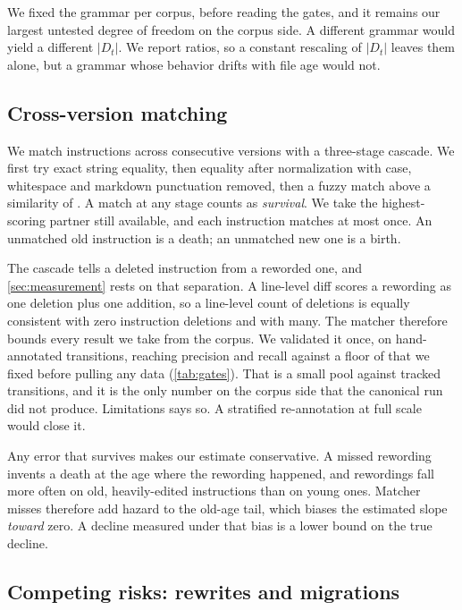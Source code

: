 We fixed the grammar per corpus, before reading the gates, and it remains our largest untested
degree of freedom on the corpus side. A different grammar would yield a different $|D_t|$. We
report ratios, so a constant rescaling of $|D_t|$ leaves them alone, but a grammar whose behavior
drifts with file age would not.

\subsection{Cross-version matching}
\label{sec:appendix:tracking}

We match instructions across consecutive versions with a three-stage cascade. We first try exact
string equality, then equality after normalization with case, whitespace and markdown punctuation
removed, then a fuzzy match above a similarity of \MatchFuzzyThreshold{}. A match at any stage
counts as \emph{survival}. We take the highest-scoring partner still available, and each
instruction matches at most once. An unmatched old instruction is a death; an unmatched new one is
a birth.

The cascade tells a deleted instruction from a reworded one, and \autoref{sec:measurement} rests on
that separation. A line-level diff scores a rewording as one deletion plus one addition, so a
line-level count of deletions is equally consistent with zero instruction deletions and with many.
The matcher therefore bounds every result we take from the corpus. We validated it once, on
\GateBPool{} hand-annotated transitions, reaching \GateBPrecision{} precision and \GateBRecall{}
recall against a floor of \GateBFloor{} that we fixed before pulling any data
(\autoref{tab:gates}). That is a small pool against \FieldMatches{} tracked transitions, and it is
the only number on the corpus side that the canonical run did not produce. Limitations says so. A
stratified re-annotation at full scale would close it.

Any error that survives makes our estimate conservative. A missed rewording invents a death at the
age where the rewording happened, and rewordings fall more often on old, heavily-edited
instructions than on young ones. Matcher misses therefore add hazard to the old-age tail, which
biases the estimated slope \emph{toward} zero. A decline measured under that bias is a lower bound
on the true decline.

\subsection{Competing risks: rewrites and migrations}
\label{sec:appendix:censoring}

